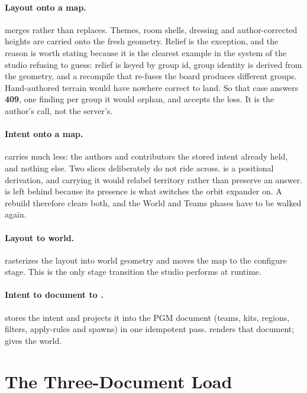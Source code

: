 \paragraph{Layout onto a map.} 
merges rather than replaces. Themes, room shells, dressing and author-corrected
heights are carried onto the fresh geometry. Relief is the exception, and the
reason is worth stating because it is the clearest example in the system of the
studio refusing to guess: relief is keyed by group id, group identity is derived
from the geometry, and a recompile that re-fuses the board produces different
groups. Hand-authored terrain would have nowhere correct to land. So that case
answers \textbf{409}, one  finding per group it would orphan, and
 accepts the loss. It is the author's call, not the server's.

\paragraph{Intent onto a map.} 
carries much less: the authors and contributors the stored intent already held,
and nothing else. Two slices deliberately do not ride across.  is
a positional derivation, and carrying it would relabel territory rather than
preserve an answer.  is left behind because its presence is what
switches the orbit expander on. A rebuild therefore clears both, and the World and
Teams phases have to be walked again.

\paragraph{Layout to world.} 
rasterizes the layout into world geometry and moves the map to the configure
stage. This is the only stage transition the studio performs at runtime.

\paragraph{Intent to document to .} 
stores the intent and projects it into the PGM document (teams, kits, regions,
filters, apply-rules and spawns) in one idempotent pass.
 renders that document;
 gives the world.

\section{The Three-Document Load}

